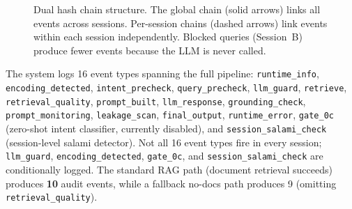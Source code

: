 \documentclass[journal]{IEEEtran}
\begin{document}
\begin{figure}[!ht]
\centering
{}
\caption{Dual hash chain structure. The global chain (solid arrows) links all events across sessions. Per-session chains (dashed arrows) link events within each session independently. Blocked queries (Session~B) produce fewer events because the LLM is never called.}
\label{fig:hash_chain}
\end{figure}

The system logs 16 event types spanning the full pipeline: \texttt{runtime\_info}, \texttt{encoding\_detected}, \texttt{intent\_precheck}, \texttt{query\_precheck}, \texttt{llm\_guard}, \texttt{retrieve}, \texttt{retrieval\_quality}, \texttt{prompt\_built}, \texttt{llm\_response}, \texttt{grounding\_check}, \texttt{prompt\_monitoring}, \texttt{leakage\_scan}, \texttt{final\_output}, \texttt{runtime\_error}, \texttt{gate\_0c} (zero-shot intent classifier, currently disabled), and \texttt{session\_salami\_check} (session-level salami detector). Not all 16 event types fire in every session; \texttt{llm\_guard}, \texttt{encoding\_detected}, \texttt{gate\_0c}, and \texttt{session\_salami\_check} are conditionally logged. The standard RAG path (document retrieval succeeds) produces \textbf{10} audit events, while a fallback no-docs path produces 9 (omitting \texttt{retrieval\_quality}).
\end{document}
